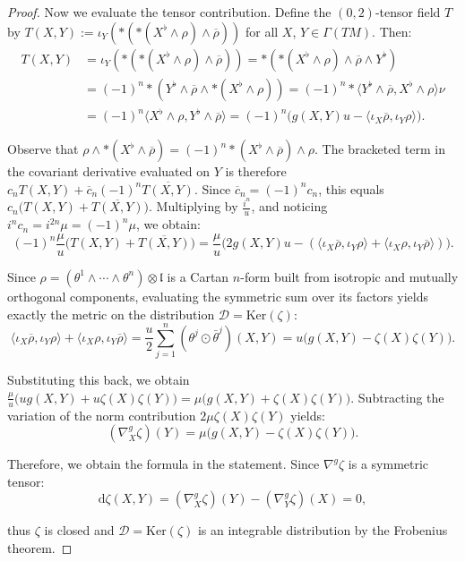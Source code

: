 \documentclass[10pt,a4paper]{amsart}
\def\dd{\mathrm{d}}
\newcommand{\escal}[1]{\langle#1\rangle}
\renewcommand{\ker}{\mathrm{Ker}}
\begin{document}
\begin{proof}
\noindent
Now we evaluate the tensor contribution. Define the $(0,2)$-tensor field $T$ by $T(X,Y):=\iota_Y(*(*(X^\flat\wedge\rho)\wedge\overline{\rho}))$ for all $X$, $Y\in\Gamma(TM)$. Then:
\begin{align*}
    T(X,Y)&=\iota_Y(*(*(X^\flat\wedge\rho)\wedge\overline{\rho}))=*(*(X^\flat\wedge\rho)\wedge\overline{\rho}\wedge Y^\flat)\\
    &=(-1)^n*(Y^\flat\wedge\overline{\rho}\wedge*(X^\flat\wedge\rho))=(-1)^n*\escal{Y^\flat\wedge\overline{\rho},X^\flat\wedge\rho}\nu\\
    &=(-1)^n\escal{X^\flat\wedge\rho,Y^\flat\wedge\overline{\rho}}=(-1)^n\big(g(X,Y)u-\escal{\iota_X\overline{\rho},\iota_Y\rho}\big).
\end{align*}

\noindent
Observe that $\rho \wedge \ast(X^\flat \wedge \overline{\rho}) = (-1)^n \ast(X^\flat \wedge \overline{\rho}) \wedge \rho$. The bracketed term in the covariant derivative evaluated on $Y$ is therefore $c_n T(X,Y) + \overline{c}_n (-1)^n \overline{T(X,Y)}$. Since $\overline{c}_n=(-1)^nc_n$, this equals $c_n \big(T(X,Y) + \overline{T(X,Y)}\big)$. Multiplying by $\frac{i^n}{u}$, and noticing $i^n c_n = i^{2n}\mu = (-1)^n\mu$, we obtain:
\begin{equation*}
(-1)^n\frac{\mu}{u} \big(T(X,Y) + \overline{T(X,Y)}\big) = \frac{\mu}{u} \big(2g(X,Y)u - (\escal{\iota_X\overline{\rho},\iota_Y\rho} + \escal{\iota_X\rho,\iota_Y\overline{\rho}})\big).
\end{equation*}

\noindent
Since $\rho = (\theta^1\wedge \cdots \wedge \theta^n) \otimes \mathfrak{l}$ is a Cartan $n$-form built from isotropic and mutually orthogonal components, evaluating the symmetric sum over its factors yields exactly the metric on the distribution $\mathcal{D}=\ker(\zeta)$:
\begin{equation*}
\escal{\iota_X\overline{\rho},\iota_Y\rho} + \escal{\iota_X\rho,\iota_Y\overline{\rho}} = \frac{u}{2}\sum_{j=1}^n(\theta^j\odot\bar{\theta}^j)(X,Y) = u\big(g(X,Y)-\zeta(X)\zeta(Y)\big).
\end{equation*}

\noindent
Substituting this back, we obtain $\frac{\mu}{u} \big( u g(X,Y) + u \zeta(X)\zeta(Y) \big) = \mu \big( g(X,Y) + \zeta(X)\zeta(Y) \big)$. Subtracting the variation of the norm contribution $2\mu\zeta(X)\zeta(Y)$ yields:
\begin{equation*}
(\nabla^g_X\zeta)(Y) = \mu\big(g(X,Y)-\zeta(X)\zeta(Y)\big).
\end{equation*}

\noindent
Therefore, we obtain the formula in the statement. Since $\nabla^g\zeta$ is a symmetric tensor:
\begin{equation*}
\dd\zeta(X,Y)=(\nabla_X^g\zeta)(Y)-(\nabla_Y^g\zeta)(X)=0,
\end{equation*}

\noindent
thus $\zeta$ is closed and $\mathcal{D}=\ker(\zeta)$ is an integrable distribution by the Frobenius theorem.
\end{proof}
\end{document}
